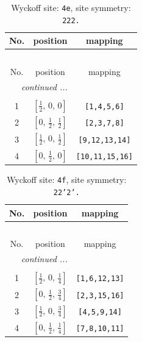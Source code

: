 \documentclass[fleqn,8pt]{jsarticle}
\begin{document}
\begin{longtable}{ccc}
\caption{Wyckoff site: {\tt 4e}, site symmetry: {\tt 222.}}
 \\
 \hline \hline
No. & position & mapping \\ \hline \endfirsthead

\multicolumn{2}{l}{\tablename\ \thetable{}} \\
 \hline \hline
No. & position & mapping \\ \hline \endhead

 \hline \hline
\multicolumn{2}{r}{\footnotesize\it continued ...} \\ \endfoot

 \hline \hline
\multicolumn{2}{r}{} \\ \endlastfoot

1 & $\left[ \frac{1}{2},\, 0,\, 0 \right]$ & {\tt [1,4,5,6]} \\ \hline
2 & $\left[ 0,\, \frac{1}{2},\, \frac{1}{2} \right]$ & {\tt [2,3,7,8]} \\ \hline
3 & $\left[ \frac{1}{2},\, 0,\, \frac{1}{2} \right]$ & {\tt [9,12,13,14]} \\ \hline
4 & $\left[ 0,\, \frac{1}{2},\, 0 \right]$ & {\tt [10,11,15,16]} \\
\end{longtable}
\renewcommand{\arraystretch}{1.2}
\begin{longtable}{ccc}
\caption{Wyckoff site: {\tt 4f}, site symmetry: {\tt 22'2'.}}
 \\
 \hline \hline
No. & position & mapping \\ \hline \endfirsthead

\multicolumn{2}{l}{\tablename\ \thetable{}} \\
 \hline \hline
No. & position & mapping \\ \hline \endhead

 \hline \hline
\multicolumn{2}{r}{\footnotesize\it continued ...} \\ \endfoot

 \hline \hline
\multicolumn{2}{r}{} \\ \endlastfoot

1 & $\left[ \frac{1}{2},\, 0,\, \frac{1}{4} \right]$ & {\tt [1,6,12,13]} \\ \hline
2 & $\left[ 0,\, \frac{1}{2},\, \frac{3}{4} \right]$ & {\tt [2,3,15,16]} \\ \hline
3 & $\left[ \frac{1}{2},\, 0,\, \frac{3}{4} \right]$ & {\tt [4,5,9,14]} \\ \hline
4 & $\left[ 0,\, \frac{1}{2},\, \frac{1}{4} \right]$ & {\tt [7,8,10,11]} \\
\end{longtable}
\end{document}
